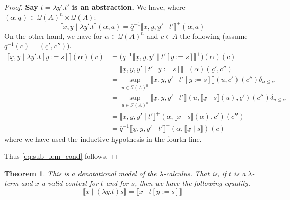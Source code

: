 \documentclass[12pt]{article}
\theoremstyle{plain}
\newtheorem{thm}{Theorem}[subsection] %
\theoremstyle{definition}
\newcommand{\call}[1]{\mathcal{#1}}
\newcommand{\Ical}{\call{I}}
\newcommand{\Qcal}{\call{Q}}
\begin{document}
\begin{proof}
		\textbf{Say $t = \lambda y'. t'$ is an abstraction.} We have, where $(\alpha, \underline{a}) \in \Qcal(A)^n \times \Qcal(A)$:
		\begin{equation}
			\llbracket \underline{x}, y \mid \lambda y'.t\rrbracket(\alpha, \underline{a}) = \overline{q}^{-1}\llbracket \underline{x}, y, y' \mid t' \rrbracket^+(\alpha, \underline{a})
			\end{equation}
		On the other hand, we have for $\alpha \in \Qcal(A)^n$ and $c \in A$ the following (assume $q^{-1}(c) = (\underline{c}', c''))$.
		\begin{align*}
			\llbracket \underline{x}, y \mid \lambda y'.t[y:=s]\rrbracket(\alpha)(c) &= \big(\overline{q}^{-1} \llbracket \underline{x}, y, y' \mid t'[y:=s]\rrbracket^+\big)(\alpha)(c)\\
			&= \llbracket \underline{x}, y, y' \mid t'[y :=s]\rrbracket^+(\alpha)(\underline{c}', c'')\\
			&= \operatorname{sup}_{u \in \Ical(A)^n}\llbracket \underline{x}, y, y' \mid t'[y := s]\rrbracket(u, \underline{c}')(c'')\delta_{u \leq \alpha}\\
			&= \operatorname{sup}_{u \in \Ical(A)^n}\llbracket \underline{x}, y, y' \mid t' \rrbracket (u, \llbracket \underline{x} \mid s \rrbracket(u), \underline{c}')(c'')\delta_{u \leq \alpha}\\
			&= \llbracket \underline{x}, y, y' \mid t' \rrbracket^+ (\alpha, \llbracket \underline{x} \mid s \rrbracket(\alpha), \underline{c}')(c'')\\
			&= \overline{q}^{-1}\llbracket \underline{x}, y, y' \mid t' \rrbracket^+(\alpha, \llbracket \underline{x} \mid s \rrbracket)(c)
			\end{align*}
		where we have used the inductive hypothesis in the fourth line.
		
		Thus \eqref{eq:sub_lem_cond} follows.
		\end{proof}
	
	\begin{thm}\label{thm:denotational_model}
		This is a denotational model of the $\lambda$-calculus. That is, if $t$ is a $\lambda$-term and $\underline{x}$ a valid context for $t$ and for $s$, then we have the following equality.
		\begin{equation}
			\llbracket \underline{x} \mid (\lambda y. t)s\rrbracket = \llbracket \underline{x} \mid t[y:=s]\rrbracket
			\end{equation}
		\end{thm}
	
\end{document}
